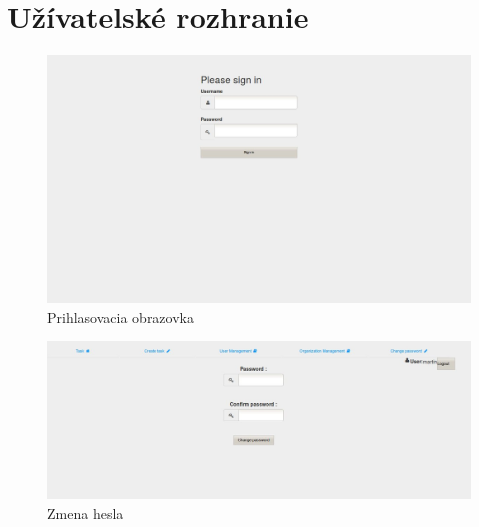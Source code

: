 \chapter{Užívatelské rozhranie}
{

\begin{figure}[htb]

\begin{center}

\includegraphics[scale=0.4]{login.jpg} 
\caption{Prihlasovacia obrazovka}



\end{center}

\end{figure}

	\begin{figure}[htb]

\begin{center}

\includegraphics[scale=0.4]{page5.jpg} 
\caption{Zmena hesla}



\end{center}

\end{figure}



\begin{figure}[htb]


\end{figure}}
